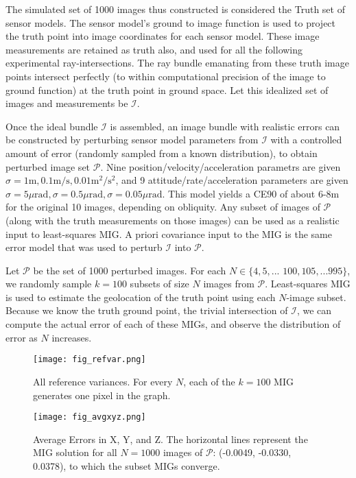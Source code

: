 \documentclass[10pt]{amsart}
\newcommand{\Iimg}{\mathcal{I}}
\newcommand{\Pimg}{\mathcal{P}}
\begin{document}
The simulated set of 1000 images thus constructed is considered the Truth set of
sensor models. The sensor model's ground to image function is used to project
the truth point into image coordinates for each sensor model. These image
measurements are retained as truth also, and used for all the following
experimental ray-intersections. The ray bundle emanating from these truth image
points intersect perfectly (to within computational precision of the image to
ground function) at the truth point in ground space. Let this idealized set of
images and measurements be $\Iimg$.

Once the ideal bundle $\Iimg$ is assembled, an image bundle with realistic
errors can be constructed by perturbing sensor model parameters from $\Iimg$ with a
controlled amount of error (randomly sampled from a known distribution), to
obtain perturbed image set $\Pimg$. Nine position/velocity/ac\-cel\-eration
parametrs are given $\sigma = 1{\mathrm m}, 0.1{\mathrm m}/{\mathrm s},
0.01{\mathrm m}^2/{\mathrm s}^2$, and 9 attitude/rate/acceleration parameters
are given
$\sigma=5\mu\mathrm{rad}, \sigma=0.5\mu\mathrm{rad}, \sigma=0.05\mu\mathrm{rad}$.
This model yields a CE90 of about 6-8m for the original 10 images, depending
on obliquity. Any subset of images of $\Pimg$ (along with the truth measurements
on those images) can be used as a realistic input to least-squares MIG. A priori
covariance input to the MIG is the same error model that was used to perturb
$\Iimg$ into $\Pimg$.

Let $\Pimg$ be the set of 1000 perturbed images. For each
$N\in\{4,5,...$ $100,105,...995\}$, we randomly sample $k=100$ subsets of size
$N$ images from $\Pimg$. Least-squares MIG is used to estimate the geolocation
of the truth point using each $N$-image subset. Because we know the truth ground
point, the trivial intersection of $\Iimg$, we can compute the actual error of
each of these MIGs, and observe the distribution of error as $N$ increases.

\begin{figure}
\texttt{[image: fig\_refvar.png]}
\caption{\label{fig:vanillaref}All reference variances. For every $N$, each of
  the $k=100$ MIG generates one pixel in the graph.}
\end{figure}

\begin{figure}
\texttt{[image: fig\_avgxyz.png]}
\caption{\label{fig:vanillaxyz}Average Errors in X, Y, and Z. The horizontal
  lines represent the MIG solution for all $N=1000$ images of $\Pimg$: (-0.0049,
  -0.0330, 0.0378), to which the subset MIGs converge.}
\end{figure}
\end{document}
